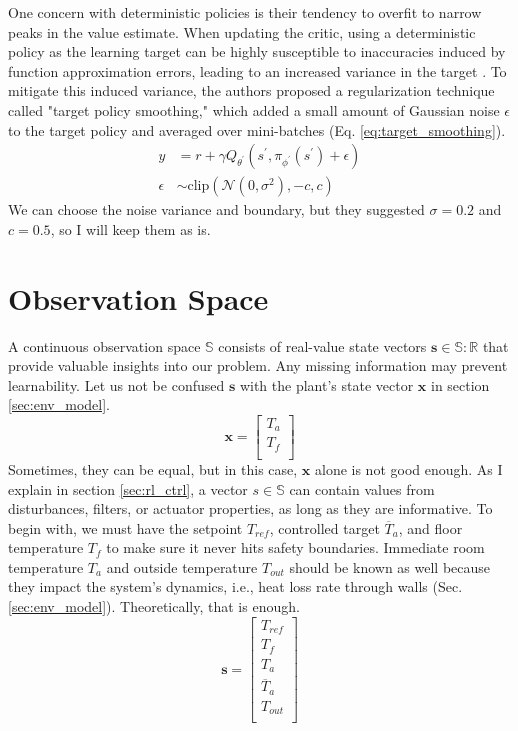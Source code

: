 \documentclass[../main.tex]{subfiles}
\begin{document}
One concern with deterministic policies is their tendency to overfit to narrow peaks in the value estimate. When updating the critic, using a deterministic policy as the learning target can be highly susceptible to inaccuracies induced by function approximation errors, leading to an increased variance in the target \cite{td3}. To mitigate this induced variance, the authors proposed a regularization technique called "target policy smoothing," which added a small amount of Gaussian noise $\epsilon$ to the target policy and averaged over mini-batches (Eq. \ref{eq:target_smoothing}).
\begin{align} \label{eq:target_smoothing}
    y &= r + \gamma Q_{\theta^\prime}(s^\prime, \pi_{\phi^\prime}(s^\prime) + \epsilon) \\
    \epsilon &\sim \text{clip} \left( \mathcal{N}(0, \sigma^2), -c, c \right)
\end{align}
We can choose the noise variance and boundary, but they suggested $\sigma = 0.2$ and $c = 0.5$, so I will keep them as is.

\section{Observation Space}
A continuous observation space $\mathbb{S}$ consists of real-value state vectors $\mathbf{s} \in \mathbb{S}:\mathbb{R}$ that provide valuable insights into our problem. Any missing information may prevent learnability. Let us not be confused $\mathbf{s}$ with the plant's state vector $\mathbf{x}$ in section \ref{sec:env_model}.
$$\mathbf{x} = \begin{bmatrix*}
    T_a \\
    T_f \\
\end{bmatrix*}$$
Sometimes, they can be equal, but in this case, $\mathbf{x}$ alone is not good enough. As I explain in section \ref{sec:rl_ctrl}, a vector $s \in \mathbb{S}$ can contain values from disturbances, filters, or actuator properties, as long as they are informative. To begin with, we must have the setpoint $T_{ref}$, controlled target $\overline{T}_a$, and floor temperature $T_f$ to make sure it never hits safety boundaries. Immediate room temperature $T_a$ and outside temperature $T_{out}$ should be known as well because they impact the system's dynamics, i.e., heat loss rate through walls (Sec. \ref{sec:env_model}). Theoretically, that is enough. 
$$\mathbf{s} = \begin{bmatrix*}
    T_{ref} \\
    T_f \\
    T_a \\
    \overline{T}_a \\
    T_{out} \\
\end{bmatrix*}$$
\end{document}
